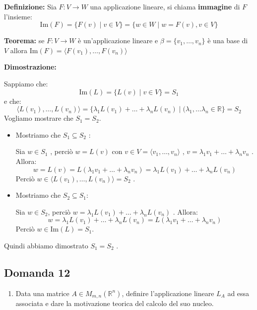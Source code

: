 \documentclass[
  a4paper,
]{article}
\providecommand{\tightlist}{%
  \setlength{\itemsep}{0pt}\setlength{\parskip}{0pt}}
\providecommand{\tightlist}{}
\begin{document}
\textbf{Definizione:} Sia \(F: V \to W\) una applicazione lineare, si
chiama \textbf{immagine} di \(F\) l'insieme: \[
\text{Im}(F) = \{F(v) \mid v \in V\} = \{w \in W \mid w = F(v), v \in V\}
\]

\textbf{Teorema:} se \(F:V\to W\) è un'applicazione lineare e
\(\beta=\{ v_1, \dots, v_n\}\) è una base di \(V\) allora
\(\text{Im}(F)=\langle F(v_1), \dots ,F(v_n)\rangle\)

\textbf{Dimostrazione:}

Sappiamo che: \[
\text{Im}(L) = \{L(v) \mid v \in V\} = S_1
\] e che: \[
\langle L(v_1), \dots , L(v_n) \rangle = \{\lambda_1 L(v_1) + \dots + \lambda_n L(v_n) \mid (\lambda_1, \dots \lambda_n \in \mathbb{R}\} = S_2
\] Vogliamo mostrare che \(S_1 = S_2\).

\begin{itemize}
\item
  Mostriamo che \(S_1 \subseteq S_2\) :

  Sia \(w \in S_1\) , perciò \(w = L(v)\) con
  \(v \in V = \langle v_1, \dots, v_n \rangle\) ,
  \(v = \lambda_1 v_1 + \dots + \lambda_n v_n\) . Allora: \[
   w = L(v) = L(\lambda_1 v_1 + \dots + \lambda_n v_n) = \lambda_1 L(v_1) + \dots + \lambda_n L(v_n)
   \] Perciò \(w \in \langle L(v_1), \dots , L(v_n) \rangle = S_2\) .
\item
  Mostriamo che \(S_2 \subseteq S_1\):

  Sia \(w \in S_2\), perciò
  \(w = \lambda_1 L(v_1) + \dots + \lambda_n L(v_n)\) . Allora: \[
   w = \lambda_1 L(v_1) + \dots + \lambda_n L(v_n) = L(\lambda_1 v_1 + \dots + \lambda_n v_n)
   \] Perciò \(w \in \text{Im}(L) = S_1\).
\end{itemize}

Quindi abbiamo dimostrato \(S_1 = S_2\) .

\hypertarget{domanda-12}{%
\subsection{Domanda 12}\label{domanda-12}}

\begin{observationbox}[Domanda]
\begin{enumerate}
\def\labelenumi{\arabic{enumi}.}
\setcounter{enumi}{11}
\tightlist
\item
  Data una matrice \(A\in M_{m,n}(\mathbb{R}^n)\), definire
  l'applicazione lineare \(L_A\) ad essa associata e dare la motivazione
  teorica del calcolo del suo nucleo.
\end{enumerate}
\end{observationbox}
\end{document}
